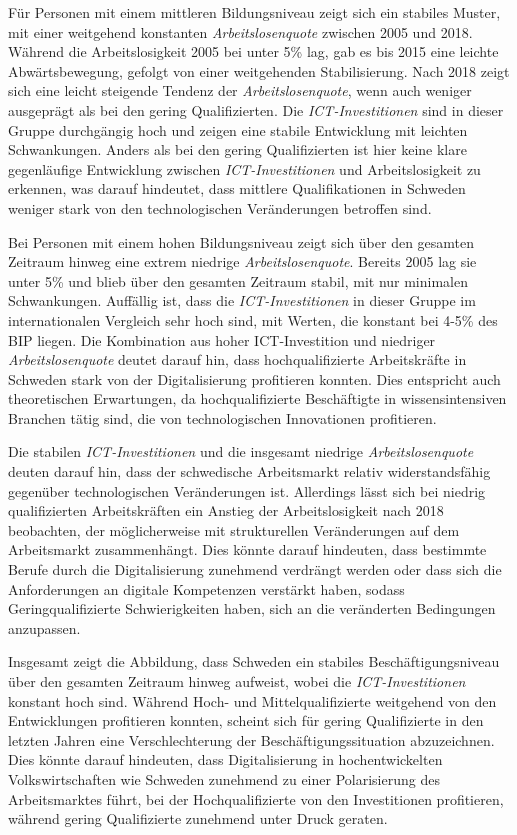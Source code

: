 Für Personen mit einem mittleren Bildungsniveau zeigt sich ein stabiles Muster, mit einer 
weitgehend konstanten \textit{Arbeitslosenquote} zwischen 2005 und 2018. Während die 
Arbeitslosigkeit 2005 bei unter 5\% lag, gab es bis 2015 eine leichte Abwärtsbewegung, gefolgt 
von einer weitgehenden Stabilisierung. Nach 2018 zeigt sich eine leicht steigende Tendenz der 
\textit{Arbeitslosenquote}, wenn auch weniger ausgeprägt als bei den gering Qualifizierten. Die 
\textit{\ac{ICT}-Investitionen} sind in dieser Gruppe durchgängig hoch und zeigen eine stabile 
Entwicklung mit leichten Schwankungen. Anders als bei den gering Qualifizierten ist hier keine 
klare gegenläufige Entwicklung zwischen \textit{\ac{ICT}-Investitionen} und Arbeitslosigkeit zu 
erkennen, was darauf hindeutet, dass mittlere Qualifikationen in Schweden weniger stark von den 
technologischen Veränderungen betroffen sind.

Bei Personen mit einem hohen Bildungsniveau zeigt sich über den gesamten Zeitraum hinweg eine 
extrem niedrige \textit{Arbeitslosenquote}. Bereits 2005 lag sie unter 5\% und blieb über den 
gesamten Zeitraum stabil, mit nur minimalen Schwankungen. Auffällig ist, dass die 
\textit{\ac{ICT}-Investitionen} in dieser Gruppe im internationalen Vergleich sehr hoch sind, mit 
Werten, die konstant bei 4-5\% des \ac{BIP} liegen. Die Kombination aus hoher 
\ac{ICT}-Investition und niedriger \textit{Arbeitslosenquote} deutet darauf hin, dass 
hochqualifizierte Arbeitskräfte in Schweden stark von der Digitalisierung profitieren konnten. 
Dies entspricht auch theoretischen Erwartungen, da hochqualifizierte Beschäftigte in 
wissensintensiven Branchen tätig sind, die von technologischen Innovationen profitieren.

Die stabilen \textit{\ac{ICT}-Investitionen} und die insgesamt niedrige 
\textit{Arbeitslosenquote} deuten darauf hin, dass der schwedische Arbeitsmarkt relativ 
widerstandsfähig gegenüber technologischen Veränderungen ist. Allerdings lässt sich bei niedrig 
qualifizierten Arbeitskräften ein Anstieg der Arbeitslosigkeit nach 2018 beobachten, der 
möglicherweise mit strukturellen Veränderungen auf dem Arbeitsmarkt zusammenhängt. Dies könnte 
darauf hindeuten, dass bestimmte Berufe durch die Digitalisierung zunehmend verdrängt werden oder 
dass sich die Anforderungen an digitale Kompetenzen verstärkt haben, sodass Geringqualifizierte 
Schwierigkeiten haben, sich an die veränderten Bedingungen anzupassen.

Insgesamt zeigt die Abbildung, dass Schweden ein stabiles Beschäftigungsniveau über den gesamten 
Zeitraum hinweg aufweist, wobei die \textit{\ac{ICT}-Investitionen} konstant hoch sind. Während 
Hoch- und Mittelqualifizierte weitgehend von den Entwicklungen profitieren konnten, scheint sich 
für gering Qualifizierte in den letzten Jahren eine Verschlechterung der Beschäftigungssituation 
abzuzeichnen. Dies könnte darauf hindeuten, dass Digitalisierung in hochentwickelten 
Volkswirtschaften wie Schweden zunehmend zu einer Polarisierung des Arbeitsmarktes führt, bei der 
Hochqualifizierte von den Investitionen profitieren, während gering Qualifizierte zunehmend unter 
Druck geraten.

